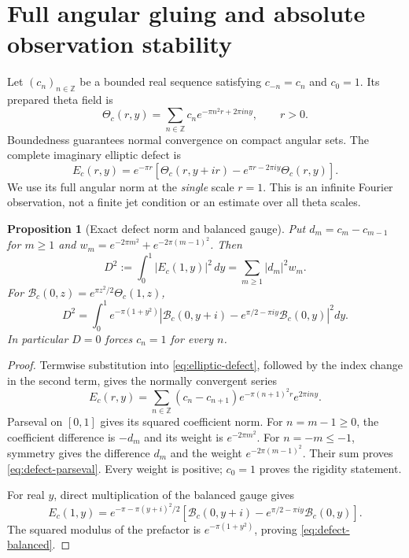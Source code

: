 \documentclass[11pt]{article}
\numberwithin{equation}{section}
\newtheorem{proposition}[theorem]{Proposition}
\theoremstyle{definition}
\theoremstyle{remark}
\begin{document}
\section{Full angular gluing and absolute observation stability}
\label{sec:gluing-stability}

Let \((c_n)_{n\in\mathbb Z}\) be a bounded real sequence satisfying
\(c_{-n}=c_n\) and \(c_0=1\).  Its prepared theta field is
\[
 \Theta_c(r,y)=\sum_{n\in\mathbb Z}c_ne^{-\pi n^2r+2\pi iny},
 \qquad r>0.
\]
Boundedness guarantees normal convergence on compact angular sets.
The complete imaginary elliptic defect is
\begin{equation}
 E_c(r,y)=e^{-\pi r}
 \left[\Theta_c(r,y+ir)-e^{\pi r-2\pi iy}\Theta_c(r,y)\right].
 \label{eq:elliptic-defect}
\end{equation}
We use its full angular norm at the \emph{single} scale \(r=1\).
This is an infinite Fourier observation, not a finite jet condition or
an estimate over all theta scales.

\begin{proposition}[Exact defect norm and balanced gauge]
\label{prop:defect-parseval}
Put \(d_m=c_m-c_{m-1}\) for \(m\geq1\) and
\(w_m=e^{-2\pi m^2}+e^{-2\pi(m-1)^2}\).  Then
\begin{equation}
 D^2:=\int_0^1|E_c(1,y)|^2\,dy
 =\sum_{m\geq1}|d_m|^2w_m.
 \label{eq:defect-parseval}
\end{equation}
For \(\mathcal B_c(0,z)=e^{\pi z^2/2}\Theta_c(1,z)\),
\begin{equation}
 D^2=\int_0^1 e^{-\pi(1+y^2)}
 \left|\mathcal B_c(0,y+i)
 -e^{\pi/2-\pi iy}\mathcal B_c(0,y)\right|^2dy.
 \label{eq:defect-balanced}
\end{equation}
In particular \(D=0\) forces \(c_n=1\) for every \(n\).
\end{proposition}

\begin{proof}
Termwise substitution into \eqref{eq:elliptic-defect}, followed by the
index change in the second term, gives the normally convergent series
\[
 E_c(r,y)=\sum_{n\in\mathbb Z}(c_n-c_{n+1})
 e^{-\pi(n+1)^2r}e^{2\pi iny}.
\]
Parseval on \([0,1]\) gives its squared coefficient norm.
For \(n=m-1\geq0\), the coefficient difference is \(-d_m\) and its
weight is \(e^{-2\pi m^2}\).  For \(n=-m\leq-1\), symmetry gives
the difference \(d_m\) and the weight \(e^{-2\pi(m-1)^2}\).
Their sum proves \eqref{eq:defect-parseval}.
Every weight is positive; \(c_0=1\) proves the rigidity statement.

For real \(y\), direct multiplication of the balanced gauge gives
\[
 E_c(1,y)=e^{-\pi-\pi(y+i)^2/2}
 \left[\mathcal B_c(0,y+i)
 -e^{\pi/2-\pi iy}\mathcal B_c(0,y)\right].
\]
The squared modulus of the prefactor is \(e^{-\pi(1+y^2)}\), proving
\eqref{eq:defect-balanced}.
\end{proof}
\end{document}
